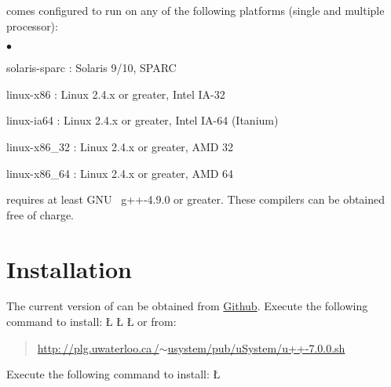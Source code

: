 \documentclass[openright,twoside]{report}
\begin{document}
\uC comes configured to run on any of the following platforms (single and multiple processor):
\begin{list}{$\bullet$}{\parsep=0pt\itemsep=0pt}
\item
solaris-sparc : Solaris 9/10, SPARC
\item
linux-x86 : Linux 2.4.x or greater, Intel IA-32
\item
linux-ia64 : Linux 2.4.x or greater, Intel IA-64 (Itanium)
\item
linux-x86\_32 : Linux 2.4.x or greater, AMD 32
\item
linux-x86\_64 : Linux 2.4.x or greater, AMD 64
\end{list}
\uC requires at least GNU~\cite{GNU-C++} g++-4.9.0 or greater.
These compilers can be obtained free of charge.


\section{Installation}

The current version of \uC can be obtained from \href{https://github.com/pabuhr/uCPP}{Github}.
Execute the following command to install:
\LGinlinefalse\LGbegin\lgrinde
\L{}
\L{}
\L{}
\endlgrinde\LGend
or from:
\begin{quote}
\href{http://plg.uwaterloo.ca/~usystem/pub/uSystem/u++-7.0.0.sh}{\textsf{http:\,//\hspace{0.1ex}plg.uwaterloo.ca\,/$\sim$usystem/pub/uSystem/u++-7.0.0.sh}}
\end{quote}
Execute the following command to install:
\LGinlinefalse\LGbegin\lgrinde
\L{}
\endlgrinde\LGend
\end{document}

